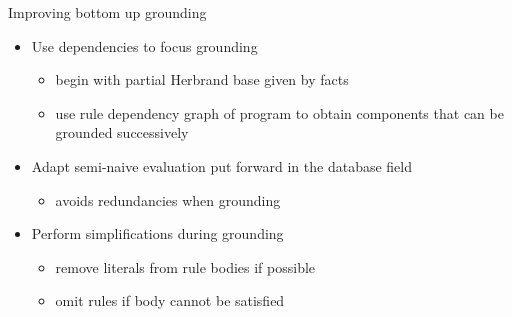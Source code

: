 \begin{frame}{Improving bottom up grounding}
  \bigskip
  \begin{itemize}
  \item Use dependencies to \alert{focus} grounding
    \begin{itemize}\normalsize
    \item begin with partial Herbrand base given by facts
    \item use rule dependency graph of program to obtain \alert{components} that can be \alert{grounded successively}
    \end{itemize}
    \medskip
  \item Adapt \alert{semi-naive evaluation} put forward in the database field
    \begin{itemize}\normalsize
    \item avoids redundancies when grounding
    \end{itemize}
    \medskip
  \item Perform \alert{simplifications} during grounding
    \begin{itemize}\normalsize
    \item remove literals from rule bodies if possible
    \item omit rules if body cannot be satisfied
    \end{itemize}
  \end{itemize}
\end{frame}
